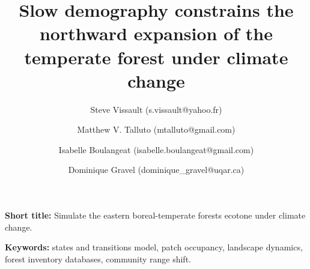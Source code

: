 \title{Slow demography constrains the northward expansion of the temperate forest under climate change}


\date{}
\author[1,*]{Steve Vissault (s.vissault@yahoo.fr)}
\author[1,2]{Matthew V. Talluto (mtalluto@gmail.com)}
\author[1]{Isabelle Boulangeat (isabelle.boulangeat@gmail.com)}
\author[1]{Dominique Gravel (dominique\_gravel@uqar.ca)}



\begin{titlingpage}
		\maketitle

		\begin{flushleft}

			\textbf{Short title:} Simulate the eastern boreal-temperate forests ecotone under climate change.

			\textbf{Keywords:} states and transitions model, patch occupancy, landscape dynamics, forest inventory databases, community range shift.
		\end{flushleft}
	\end{titlingpage}
